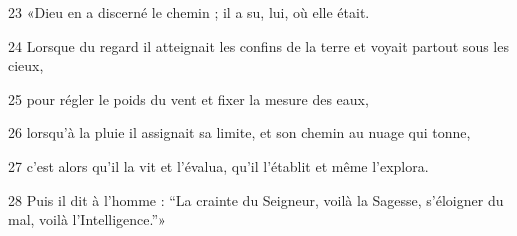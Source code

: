 
23 «Dieu en a discerné le chemin ; il a su, lui, où elle était.

24 Lorsque du regard il atteignait les confins de la terre et voyait partout sous les cieux,

25 pour régler le poids du vent et fixer la mesure des eaux,

26 lorsqu’à la pluie il assignait sa limite, et son chemin au nuage qui tonne,

27 c’est alors qu’il la vit et l’évalua, qu’il l’établit et même l’explora.

28 Puis il dit à l’homme : “La crainte du Seigneur, voilà la Sagesse, s’éloigner du mal, voilà l’Intelligence.”»